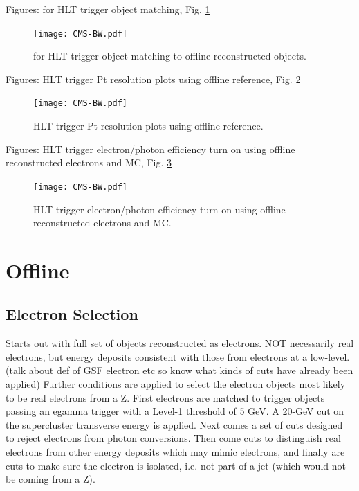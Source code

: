 Figures: \DR for HLT trigger object matching, Fig. \ref{fig:HLTriggerObjectDeltaR}

 \begin{figure}[htb]
  \begin{center}
    \texttt{[image: CMS-BW.pdf]}
  \end{center}
  \caption[\DR for HLT trigger object matching to offline]{\DR for HLT trigger object matching to offline-reconstructed objects.}
  \label{fig:HLTriggerObjectDeltaR}
 \end{figure}

Figures: HLT trigger Pt resolution plots using offline reference, Fig. \ref{fig:HLTriggerObjectResolutions}

 \begin{figure}[htb]
  \begin{center}
    \texttt{[image: CMS-BW.pdf]}
  \end{center}
  \caption[HLT trigger Pt resolution plots using offline reference]{HLT trigger Pt resolution plots using offline reference.}
  \label{fig:HLTriggerObjectResolutions}
 \end{figure}

Figures: HLT trigger electron/photon efficiency turn on using offline reconstructed electrons and MC, Fig. \ref{fig:HLTriggerObjectEfficiencies}

 \begin{figure}[htb]
  \begin{center}
    \texttt{[image: CMS-BW.pdf]}
  \end{center}
  \caption[HLT trigger electron/photon efficiency turn on using offline reconstructed electrons and MC]{HLT trigger electron/photon efficiency turn on using offline reconstructed electrons and MC.}
  \label{fig:HLTriggerObjectEfficiencies}
 \end{figure}




\section{Offline}
\subsection{Electron Selection}
Starts out with full set of objects reconstructed as electrons.  
NOT necessarily real electrons, but energy deposits consistent with those from electrons at a low-level.  
(talk about def of GSF electron etc so know what kinds of cuts have already been applied)
Further conditions are applied to select the electron objects most likely to be real electrons from a Z.  
First electrons are matched to trigger objects passing an egamma trigger with a Level-1 threshold of 5 GeV.  
A 20-GeV cut on the supercluster transverse energy is applied.  
Next comes a set of cuts designed to reject electrons from photon conversions.  
Then come cuts to distinguish real electrons from other energy deposits which may mimic electrons, 
and finally are cuts to make sure the electron is isolated, i.e. not part of a jet (which would not be coming from a Z).  

